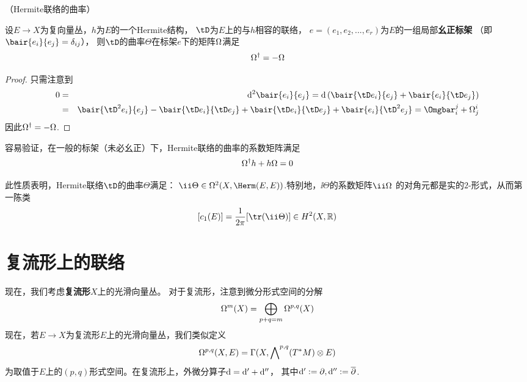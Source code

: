 \begin{prop}（Hermite联络的曲率）
\label{Hermite 联络的曲率-prop}

设$E\to X$为复向量丛，$h$为$E$的一个Hermite结构，
$\tD$为$E$上的与$h$相容的联络，
$e=(e_1,e_2,...,e_r)$为$E$的一组局部\textbf{幺正标架}
（即$\bair{e_i}{e_j}=\delta_{ij}$），
则$\tD$的曲率$\Theta$在标架$e$下的矩阵$\Omega$满足
$$\Omega^\dag=-\Omega$$
\end{prop}

\begin{proof}只需注意到
\begin{eqnarray*}
     0
&=&
     \td^2\bair{e_i}{e_j}
 =
     \td\left(
       \bair{\tD e_i}{e_j}
      +\bair{e_i}{\tD e_j}
     \right)\\
&=&
     \bair{\tD^2e_i}{e_j}
    -\bair{\tD e_i}{\tD e_j}
    +\bair{\tD e_i}{\tD e_j}
    +\bair{e_i}{\tD^2e_j}
 =
     \Omgbar^j_i+\Omg^i_j
\end{eqnarray*}
因此$\Omega^\dag=-\Omega$.
\end{proof}

容易验证，在一般的标架（未必幺正）下，Hermite联络的曲率的系数矩阵满足
$$\Omega^\dag h+h\Omega=0$$


\begin{rem}
此性质表明，Hermite联络$\tD$的曲率$\Theta$满足：
$\ii\Theta\in\Omg^2(X,\Herm(E,E))$.特别地，$\ii\Theta$的系数矩阵$\ii\Omg$
的对角元都是实的$2$-形式，从而第一陈类
$$[c_1(E)]=\frac{1}{2\pi}[\tr(\ii\Theta)]\in H^2(X,\bbR)$$
\end{rem}

\section{复流形上的联络}
现在，我们考虑\textbf{复流形}$X$上的光滑向量丛。
对于复流形，注意到微分形式空间的分解
$$\Omega^{m}(X)=\bigoplus_{p+q=m}\Omega^{p,q}(X)$$
现在，若$E\to X$为复流形$E$上的光滑向量丛，我们类似定义
$$\Omega^{p,q}(X,E)=\Gamma(X,\bigwedge\nolimits^{p,q}(T^*M)\otimes E)$$
为取值于$E$上的$(p,q)$形式空间。在复流形上，外微分算子$\mathrm{d}=\mathrm{d}'+\mathrm{d}''$，
其中$\mathrm{d}':=\partial,\mathrm{d}'':=\overline{\partial}$.


